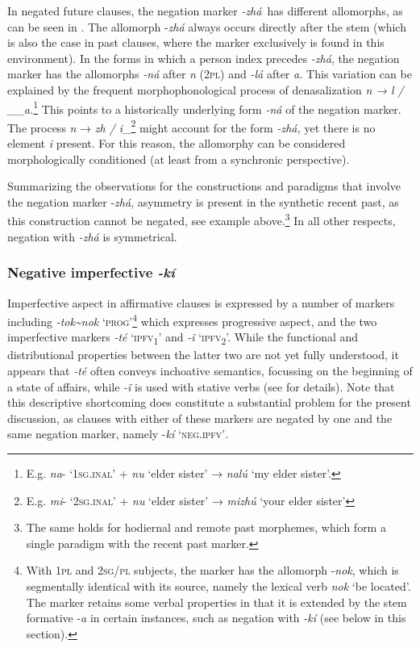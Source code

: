 \documentclass[output=paper,colorlinks,citecolor=brown]{langscibook}
\begin{document}
In negated future clauses, the negation marker \textit{{}-zhá}~has different allomorphs, as can be seen in . The allomorph -\textit{zhá} always occurs directly after the stem (which is also the case in past clauses, where the marker exclusively is found in this environment). In the forms in which a person index precedes \textit{{}-zhá}, the negation marker has the allomorphs \textit{{}-ná} after \textit{n} (2\textsc{pl)} and \textit{{}-lá} after \textit{a.} This variation can be explained by the frequent morphophonological process of denasalization \textit{n → l / \_\_a.}\footnote{E.g. \textit{na}{}- ‘1\textsc{sg.inal’} \textsc{+} \textit{nu} ‘elder sister’ → \textit{nalú} ‘my elder sister’.} This points to a historically underlying form \textit{{}-ná} of the negation marker. The process \textit{n} → \textit{zh / i\_}\footnote{E.g. \textit{mi}{}- ‘2\textsc{sg.inal’} \textsc{+} \textit{nu} ‘elder sister’ → \textit{mizhú} ‘your elder sister’} might account for the form \textit{{}-zhá,} yet there is no element \textit{i} present. For this reason, the allomorphy can be considered morphologically conditioned (at least from a synchronic perspective).

Summarizing the observations for the constructions and paradigms that involve the negation marker -\textit{zhá}, asymmetry is present in the synthetic recent past, as this construction cannot be negated, see example  above.\footnote{The same holds for hodiernal and remote past morphemes, which form a single paradigm with the recent past marker.} In all other respects, negation with \textit{{}-zhá} is symmetrical.

\subsubsection{Negative imperfective \textit{-kí}} \label{sec:kog:2.1.2}

Imperfective aspect in affirmative clauses is expressed by a number of markers including \textit{{}-tok{\textasciitilde}nok} ‘\textsc{prog’}\footnote{With 1\textsc{pl} and \textsc{2sg/pl} subjects, the marker has the allomorph -\textit{nok}, which is segmentally identical with its source, namely the lexical verb \textit{nok} ‘be located’. The marker retains some verbal properties in that it is extended by the stem formative -\textit{a} in certain instances, such as negation with \textit{{}-kí} (see below in this section).} which expresses progressive aspect, and the two imperfective markers \textit{{}-t\'{e}} ‘\textsc{ipfv}\textsc{\textsubscript{1}}’ and \textit{{}-ĩ} ‘\textsc{ipfv}\textsc{\textsubscript{2}}’. While the functional and distributional properties between the latter two are not yet fully understood, it appears that \textit{{}-té} often conveys inchoative semantics, focussing on the beginning of a state of affairs, while \textit{{}-ĩ} is used with stative verbs (see \citealt{Knuchel2022} for details). Note that this descriptive shortcoming does constitute a substantial problem for the present discussion, as clauses with either of these markers are negated by one and the same negation marker, namely -\textit{kí} ‘\textsc{neg.ipfv’}.
\end{document}
